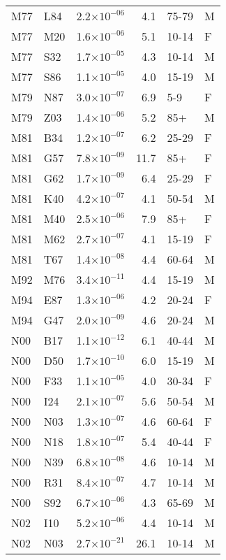 \begin{longtable}{lllrll}
   M77 & L84 & 2.2$\times10^{-06}$ & 4.1 & 75-79 & M \\ 
   M77 & M20 & 1.6$\times10^{-06}$ & 5.1 & 10-14 & F \\ 
   M77 & S32 & 1.7$\times10^{-05}$ & 4.3 & 10-14 & M \\ 
   M77 & S86 & 1.1$\times10^{-05}$ & 4.0 & 15-19 & M \\ 
   M79 & N87 & 3.0$\times10^{-07}$ & 6.9 & 5-9 & F \\ 
   M79 & Z03 & 1.4$\times10^{-06}$ & 5.2 & 85+ & M \\ 
   M81 & B34 & 1.2$\times10^{-07}$ & 6.2 & 25-29 & F \\ 
   M81 & G57 & 7.8$\times10^{-09}$ & 11.7 & 85+ & F \\ 
   M81 & G62 & 1.7$\times10^{-09}$ & 6.4 & 25-29 & F \\ 
   M81 & K40 & 4.2$\times10^{-07}$ & 4.1 & 50-54 & M \\ 
   M81 & M40 & 2.5$\times10^{-06}$ & 7.9 & 85+ & F \\ 
   M81 & M62 & 2.7$\times10^{-07}$ & 4.1 & 15-19 & F \\ 
   M81 & T67 & 1.4$\times10^{-08}$ & 4.4 & 60-64 & M \\ 
   M92 & M76 & 3.4$\times10^{-11}$ & 4.4 & 15-19 & M \\ 
   M94 & E87 & 1.3$\times10^{-06}$ & 4.2 & 20-24 & F \\ 
   M94 & G47 & 2.0$\times10^{-09}$ & 4.6 & 20-24 & M \\ 
   N00 & B17 & 1.1$\times10^{-12}$ & 6.1 & 40-44 & M \\ 
   N00 & D50 & 1.7$\times10^{-10}$ & 6.0 & 15-19 & M \\ 
   N00 & F33 & 1.1$\times10^{-05}$ & 4.0 & 30-34 & F \\ 
   N00 & I24 & 2.1$\times10^{-07}$ & 5.6 & 50-54 & M \\ 
   N00 & N03 & 1.3$\times10^{-07}$ & 4.6 & 60-64 & F \\ 
   N00 & N18 & 1.8$\times10^{-07}$ & 5.4 & 40-44 & F \\ 
   N00 & N39 & 6.8$\times10^{-08}$ & 4.6 & 10-14 & M \\ 
   N00 & R31 & 8.4$\times10^{-07}$ & 4.7 & 10-14 & M \\ 
   N00 & S92 & 6.7$\times10^{-06}$ & 4.3 & 65-69 & M \\ 
   N02 & I10 & 5.2$\times10^{-06}$ & 4.4 & 10-14 & M \\ 
   N02 & N03 & 2.7$\times10^{-21}$ & 26.1 & 10-14 & M \\ 

\end{longtable}
